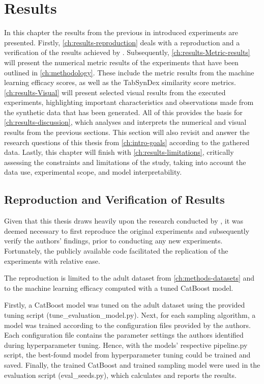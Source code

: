 \chapter{Results}
\label{ch:results}

In this chapter the results from the previous in  introduced experiments are presented.
Firstly, \autoref{ch:results-reproduction} deals with a reproduction and a verification of the results achieved by \textcite{kotelnikov2022TabDDPMModellingTabular}.
Subsequently, \autoref{ch:results-Metric-results} will present the numerical metric results of the experiments that have been outlined in \autoref{ch:methodology}.
These include the metric results from the machine learning efficacy scores, as well as the TabSynDex similarity score metrics.
\autoref{ch:results-Visual} will present selected visual results from the executed experiments, highlighting important characteristics and observations made from the synthetic data that has been generated.
All of this provides the basis for \autoref{ch:results-discussion}, which analyses and interprets the numerical and visual results from the previous sections.
This section will also revisit and answer the research questions of this thesis from \autoref{ch:intro-goals} according to the gathered data.
Lastly, this chapter will finish with \autoref{ch:results-limitations}, critically assessing the constraints and limitations of the study, taking into account the data use, experimental scope, and model interpretability.

\section{Reproduction and Verification of Results}
\label{ch:results-reproduction}

Given that this thesis draws heavily upon the research conducted by \cite{kotelnikov2022TabDDPMModellingTabular},
it was deemed necessary to first reproduce the original experiments and subsequently verify the authors' findings,
prior to conducting any new experiments.
Fortunately, the publicly available code \cite{akim2023TabDDPMModellingTabular} facilitated the replication of the experiments with relative ease.

The reproduction is limited to the adult dataset from \autoref{ch:methods-datasets} and to the machine learning efficacy computed with a tuned CatBoost \cite{prokhorenkova2018CatBoostUnbiasedBoosting} model.

Firstly, a CatBoost model was tuned on the adult dataset using the provided tuning script (tune\_evaluation\_model.py).
Next, for each sampling algorithm, a model was trained according to the configuration files provided by the authors.
Each configuration file contains the parameter settings the authors identified during hyperparameter tuning.
Hence, with the models' respective pipeline.py script, the best-found model from hyperparameter tuning could be trained and saved.
Finally, the trained CatBoost and trained sampling model were used in the evaluation script (eval\_seeds.py), which calculates and reports the results.

